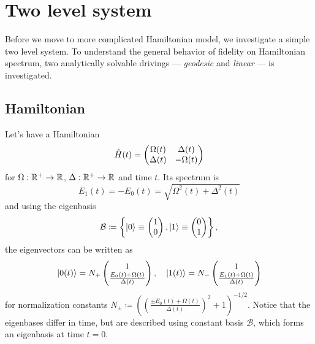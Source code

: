 \chapter{Two level system}
\label{chap:twoLevelSystem}
Before we move to more complicated Hamiltonian model, we investigate a simple two level system. To understand the general behavior of fidelity on Hamiltonian spectrum, two analytically solvable drivings — \emph{geodesic} and \emph{linear} — is investigated.

\section{Hamiltonian}
Let's have a Hamiltonian
\begin{equation}
    \hat{H}(t)=\begin{pmatrix}
        \Omega(t)&\Delta(t)\\
        \Delta(t)&-\Omega(t)
    \end{pmatrix}
\end{equation}
for $\Omega: \mathbb{R}^+\rightarrow \mathbb{R}$, $\Delta: \mathbb{R}^+\rightarrow \mathbb{R}$ and time $t$. Its spectrum is
\begin{equation}
    E_1(t)=-E_0(t)= \sqrt{\Omega^2(t)+\Delta^2(t)}
    \label{eq:energy}
\end{equation}
and using the eigenbasis
\begin{equation}
    \mathcal{B}\coloneqq \left\{
        \ket{0}\equiv\begin{pmatrix}
                1\\0
            \end{pmatrix},
        \ket{1}\equiv\begin{pmatrix}
            0\\1
        \end{pmatrix} \right\},
    \label{eq:eigenbasisDef}
\end{equation}
the eigenvectors  can be written as 
\begin{equation}
\ket{0(t)}=N_+ \begin{pmatrix}
    1\\ \frac{E_0(t)+\Omega(t)}{\Delta(t)}
\end{pmatrix},\quad \ket{1(t)}=N_-\begin{pmatrix}
    1\\ \frac{E_1(t)+\Omega(t)}{\Delta(t)}
   \end{pmatrix}
   \label{eq:eigenvectors}
\end{equation}
for normalization constants $N_\pm\coloneqq\left(\left(\frac{\pm E_0(t)+\Omega(t)}{\Delta(t)}\right)^2+1\right)^{-1/2}$. Notice that the eigenbases differ in time, but are described using constant basis $\mathcal B$, which forms an eigenbasis at time $t=0$.

